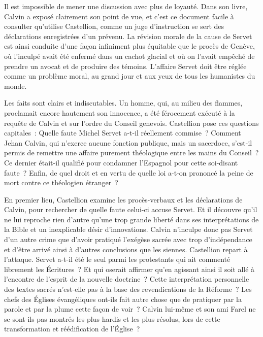 \documentclass[french,twoside]{book} %
\newcommand{\astermono}{\medskip\centerline{\color{rubric}\large\selectfont{\syms ✻}}\medskip\par}%
\begin{document}
\noindent Il est impossible de mener une discussion avec plus de loyauté. Dans son livre, Calvin a exposé clairement son point de vue, et c’est ce document facile à consulter qu’utilise Castellion, comme un juge d’instruction se sert des déclarations enregistrées d’un prévenu. La révision morale de la cause de Servet est ainsi conduite d’une façon infiniment plus équitable que le procès de Genève, où l’inculpé avait été enfermé dans un cachot glacial et où on l’avait empêché de prendre un avocat et de produire des témoins. L’affaire Servet doit être réglée comme un problème moral, au grand jour et aux yeux de tous les humanistes du monde.\par
Les faits sont clairs et indiscutables. Un homme, qui, au milieu des flammes, proclamait encore hautement son innocence, a été férocement exécuté à la requête de Calvin et sur l’ordre du Conseil genevois. Castellion pose ces questions capitales : Quelle faute Michel Servet a-t-il réellement commise ? Comment Jehan Calvin, qui n’exerce aucune fonction publique, mais un sacerdoce, s’est-il permis de remettre une affaire purement théologique entre les mains du Conseil ? Ce dernier était-il qualifié pour condamner l’Espagnol pour cette soi-disant faute ? Enfin, de quel droit et en vertu de quelle loi a-t-on prononcé la peine de mort contre ce théologien étranger ?\par

\astermono

\noindent En premier lieu, Castellion examine les procès-verbaux et les déclarations de Calvin, pour rechercher de quelle faute celui-ci accuse Servet. Et il découvre qu’il ne lui reproche rien d’autre qu’une trop grande liberté dans ses interprétations de la Bible et un inexplicable désir d’innovations. Calvin n’inculpe donc pas Servet d’un autre crime que d’avoir pratiqué l’exégèse sacrée avec trop d’indépendance et d’être arrivé ainsi à d’autres conclusions que les siennes. Castellion repart à l’attaque. Servet a-t-il été le seul parmi les protestants qui ait commenté librement les Écritures ? Et qui oserait affirmer qu’en agissant ainsi il soit allé à l’encontre de l’esprit de la nouvelle doctrine ? Cette interprétation personnelle des textes sacrés n’est-elle pas à la base des revendications de la Réforme ? Les chefs des Églises évangéliques ont-ils fait autre chose que de pratiquer par la parole et par la plume cette façon de voir ? Calvin lui-même et son ami Farel ne se sont-ils pas montrés les plus hardis et les plus résolus, lors de cette transformation et réédification de l’Église ?\par
\end{document}
